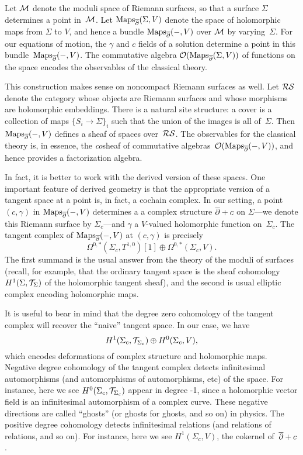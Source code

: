 \def\Maps{\operatorname{Maps}}

Let $\mathcal M$ denote the moduli space of Riemann surfaces,
so that a surface $\Sigma$ determines a point in~$\mathcal M$.
Let $\Maps_{\dbar}(\Sigma,V)$ denote the space of holomorphic maps from $\Sigma$ to $V$,
and hence a bundle $\Maps_{\dbar}(-,V)$ over $\mathcal M$ by varying~$\Sigma$.
For our equations of motion, the $\gamma$ and $c$ fields of a solution determine a point in this bundle~$\Maps_{\dbar}(-,V)$. 
The commutative algebra $\cO(\Maps_{\dbar}(\Sigma,V))$ of functions on the space encodes the  observables of the classical theory.

\def\RS{{\cR\cS}}

This construction makes sense on noncompact Riemann surfaces as well.
Let $\RS$ denote the category whose objects are Riemann surfaces and whose morphisms are holomorphic embeddings.
There is a natural site structure: a cover is a collection of maps $\{S_i \to \Sigma\}_i$ such that the union of the images is all of~$\Sigma$.
Then $\Maps_{\dbar}(-,V)$ defines a sheaf of spaces over~$\RS$.
The observables for the classical theory is, in essence, the {\em co}\/sheaf of commutative algebras~$\cO(\Maps_{\dbar}(-,V))$,
and hence provides a factorization algebra.

In fact, it is better to work with the derived version of these spaces.
One important feature of derived geometry is that the appropriate version of a tangent space at a point is, in fact, a cochain complex.
In our setting, a point $(c,\gamma)$ in $\Maps_{\dbar}(-,V)$ determines a a complex structure $\overline{\partial} + c$ on $\Sigma$---we denote this Riemann surface by $\Sigma_c$---and $\gamma$ a $V$-valued holomorphic function on~$\Sigma_c$.
The tangent complex of $\Maps_{\dbar}(-,V)$ at $(c,\gamma)$ is precisely 
\[
\Omega^{0,*}(\Sigma_c,T^{1,0})[1] \oplus \Omega^{0,*}(\Sigma_c,V).
\]
The first summand is the usual answer from the theory of the moduli of surfaces 
(recall, for example, that the ordinary tangent space is the sheaf cohomology $H^1(\Sigma,\mathcal T_\Sigma)$ of the holomorphic tangent sheaf),
and the second is usual elliptic complex encoding holomorphic maps.

\begin{rmk}
It is useful to bear in mind that the degree zero cohomology of the tangent complex will recover the ``naive'' tangent space. 
In our case, we have 
\[
H^1(\Sigma_c,\mathcal T_{\Sigma_c}) \oplus H^0(\Sigma_c,V),
\]
which encodes deformations of complex structure and holomorphic maps.
Negative degree cohomology of the tangent complex detects infinitesimal automorphisms (and automorphisms of automorphisms, etc) of the space.
For instance, here we see $H^0(\Sigma_c,\mathcal T_{\Sigma_c})$ appear in degree -1, 
since a holomorphic vector field is an infinitesimal automorphism of a complex curve.
These negative directions are called ``ghosts'' (or ghosts for ghosts, and so on) in physics.
The positive degree cohomology detects infinitesimal relations (and relations of relations, and so on).
For instance, here we see $H^1(\Sigma_c,V)$, the cokernel of~$\overline{\partial}+c$. 
\end{rmk}

